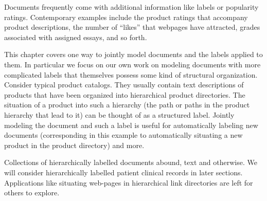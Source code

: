 
Documents frequently come with additional information like labels or popularity ratings.   Contemporary examples include the product ratings that  accompany product descriptions, the number of ``likes'' that webpages have attracted, grades associated with assigned essays, and so forth.

This chapter covers one way to jointly model documents and the labels applied to them.  In particular we focus on our own work on modeling documents with more complicated labels that themselves possess some kind of structural organization.  Consider typical product catalogs.  They usually contain text  descriptions of products that have been organized into hierarchical product directories.  The situation of a product into such a hierarchy (the path or paths in the product hierarchy that lead to it) can be thought of as a structured label.  Jointly modeling the document and such a label is useful for automatically labeling new documents (corresponding in this example to automatically situating a new product in the product directory) and more.

Collections of hierarchically labelled  documents abound, text and otherwise.  We will consider hierarchically labelled  patient clinical records in later sections.  Applications like situating web-pages in hierarchical link directories are left for others to explore.

